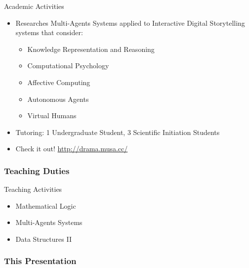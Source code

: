 \documentclass{beamer}
\begin{document}
\begin{frame}{Academic Activities}

\begin{itemize}
  \item Researches Multi-Agents Systems applied to Interactive Digital Storytelling systems that consider: 
  \begin{itemize}
	 \item Knowledge Representation and Reasoning
   \item Computational Psychology
   \item Affective Computing
   \item Autonomous Agents
   \item Virtual Humans
  \end{itemize}
  \item Tutoring: 1 Undergraduate Student, 3 Scientific Initiation Students
	\item Check it out! \url{http://drama.musa.cc/}
\end{itemize}
\end{frame}

\subsubsection{Teaching Duties}

\begin{frame}{Teaching Activities}

\begin{itemize}
  \item Mathematical Logic
  \item Multi-Agents Systems
  \item Data Structures II
\end{itemize}
\end{frame}


\subsubsection{This Presentation}
\end{document}

